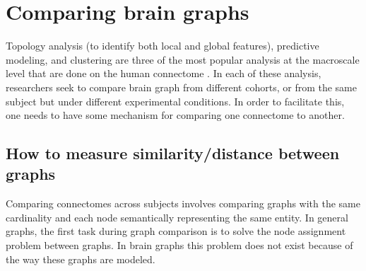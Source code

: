 \section*{Comparing brain graphs} 
Topology analysis (to identify both local and global features), predictive modeling, and clustering are three of the most popular analysis at the macroscale level that are done on the human connectome \cite{}. In each of these analysis, researchers seek to compare brain graph from different cohorts, or from the same subject but under different experimental conditions. In order to facilitate this, one needs to have some mechanism for comparing one connectome to another.  

\subsection*{How to measure similarity/distance between graphs}
Comparing connectomes across subjects involves comparing graphs with the same cardinality and each node semantically representing the same entity. In general graphs, the first task during graph comparison is to solve the node assignment problem between graphs. In brain graphs this problem does not exist because of the way these graphs are modeled. 

